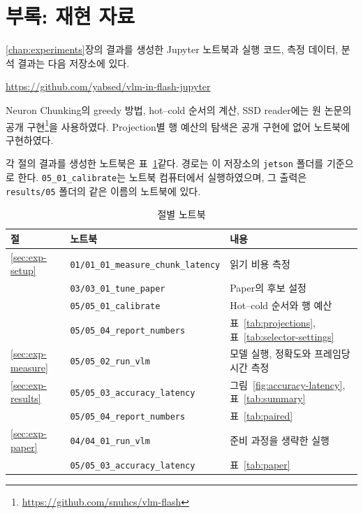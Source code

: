 \chapter*{부록: 재현 자료}\label{chap:appendix}

\setcounter{table}{0}
\renewcommand{\thetable}{A.\arabic{table}}

\ref{chap:experiments}장의 결과를 생성한 Jupyter 노트북과 실행 코드, 측정 데이터, 분석 결과는 다음 저장소에 있다.

\begin{center}
\url{https://github.com/yabsed/vlm-in-flash-jupyter}
\end{center}

Neuron Chunking의 greedy 방법, hot--cold 순서의 계산, SSD reader에는 원 논문의 공개 구현\footnote{\url{https://github.com/snuhcs/vlm-flash}}을 사용하였다. Projection별 행 예산의 탐색은 공개 구현에 없어 노트북에 구현하였다.

각 절의 결과를 생성한 노트북은 표~\ref{tab:notebooks}\와 같다. 경로는 이 저장소의 \texttt{jetson} 폴더를 기준으로 한다. \texttt{05\_01\_calibrate}는 노트북 컴퓨터에서 실행하였으며, 그 출력은 \texttt{results/05} 폴더의 같은 이름의 노트북에 있다.

\begin{table}[htbp]
    \centering
    \caption{절별 노트북}
    \label{tab:notebooks}
    \begin{tabular}{lll}
        \toprule
        절 & 노트북 & 내용 \\
        \midrule
        \ref{sec:exp-setup} & \texttt{01/01\_01\_measure\_chunk\_latency} & 읽기 비용 측정 \\
                            & \texttt{03/03\_01\_tune\_paper} & Paper의 후보 설정 \\
                            & \texttt{05/05\_01\_calibrate} & Hot--cold 순서와 행 예산 \\
                            & \texttt{05/05\_04\_report\_numbers} & 표~\ref{tab:projections}, 표~\ref{tab:selector-settings} \\
        \midrule
        \ref{sec:exp-measure} & \texttt{05/05\_02\_run\_vlm} & 모델 실행, 정확도와 프레임당 시간 측정 \\
        \midrule
        \ref{sec:exp-results} & \texttt{05/05\_03\_accuracy\_latency} & 그림~\ref{fig:accuracy-latency}, 표~\ref{tab:summary} \\
                              & \texttt{05/05\_04\_report\_numbers} & 표~\ref{tab:paired} \\
        \midrule
        \ref{sec:exp-paper} & \texttt{04/04\_01\_run\_vlm} & 준비 과정을 생략한 실행 \\
                            & \texttt{05/05\_03\_accuracy\_latency} & 표~\ref{tab:paper} \\
        \bottomrule
    \end{tabular}
\end{table}
